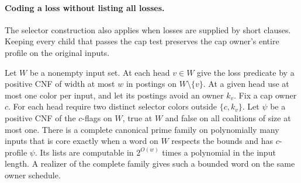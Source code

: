 \paragraph{Coding a loss without listing all losses.}
The selector construction also applies when losses are supplied by
short clauses. Keeping every child that passes the cap test
preserves the cap owner's entire profile on the original inputs.

\begin{theorem}
\label{core:thm:succinct-profile-cap}
Let $W$ be a nonempty input set. At each head $v\in W$ give the
loss predicate by a positive CNF of width at most $w$ in postings
on $W\setminus\{v\}$. At a given head use at most one color per
input, and let its postings avoid an owner $k_v$. Fix a cap owner
$c$. For each head require two distinct selector colors outside
$\{c,k_v\}$.
Let $\psi$ be a positive CNF of the $c$-flags on $W$, true at $W$
and false on all coalitions of size at most one. There is a
complete canonical prime family on polynomially many inputs that
is core exactly when a word on $W$ respects the bounds and has
$c$-profile $\psi$. Its lists are computable in $2^{O(w)}$ times a
polynomial in the input length. A realizer of the complete family
gives such a bounded word on the same owner schedule.
\end{theorem}
